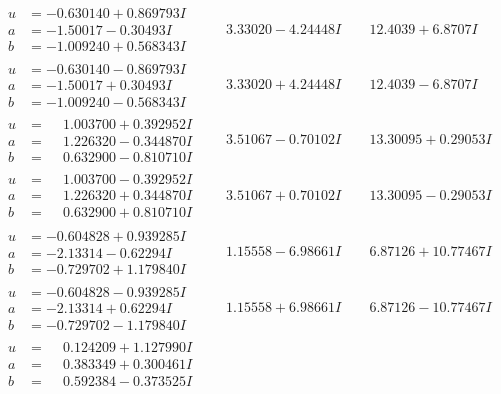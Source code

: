 \documentclass[1p]{elsarticle_modified}
\theoremstyle{definition}
\begin{document}
$$\begin{array}{c|c|c}
\begin{aligned}
u &= -0.630140 + 0.869793 I \\
a &= -1.50017 - 0.30493 I \\
b &= -1.009240 + 0.568343 I\end{aligned}
 & \phantom{-}3.33020 - 4.24448 I & \phantom{-}12.4039 + 6.8707 I \\ \hline\begin{aligned}
u &= -0.630140 - 0.869793 I \\
a &= -1.50017 + 0.30493 I \\
b &= -1.009240 - 0.568343 I\end{aligned}
 & \phantom{-}3.33020 + 4.24448 I & \phantom{-}12.4039 - 6.8707 I \\ \hline\begin{aligned}
u &= \phantom{-}1.003700 + 0.392952 I \\
a &= \phantom{-}1.226320 - 0.344870 I \\
b &= \phantom{-}0.632900 - 0.810710 I\end{aligned}
 & \phantom{-}3.51067 - 0.70102 I & \phantom{-}13.30095 + 0.29053 I \\ \hline\begin{aligned}
u &= \phantom{-}1.003700 - 0.392952 I \\
a &= \phantom{-}1.226320 + 0.344870 I \\
b &= \phantom{-}0.632900 + 0.810710 I\end{aligned}
 & \phantom{-}3.51067 + 0.70102 I & \phantom{-}13.30095 - 0.29053 I \\ \hline\begin{aligned}
u &= -0.604828 + 0.939285 I \\
a &= -2.13314 - 0.62294 I \\
b &= -0.729702 + 1.179840 I\end{aligned}
 & \phantom{-}1.15558 - 6.98661 I & \phantom{-}6.87126 + 10.77467 I \\ \hline\begin{aligned}
u &= -0.604828 - 0.939285 I \\
a &= -2.13314 + 0.62294 I \\
b &= -0.729702 - 1.179840 I\end{aligned}
 & \phantom{-}1.15558 + 6.98661 I & \phantom{-}6.87126 - 10.77467 I \\ \hline\begin{aligned}
u &= \phantom{-}0.124209 + 1.127990 I \\
a &= \phantom{-}0.383349 + 0.300461 I \\
b &= \phantom{-}0.592384 - 0.373525 I\end{aligned}

\end{array}$$
\end{document}
